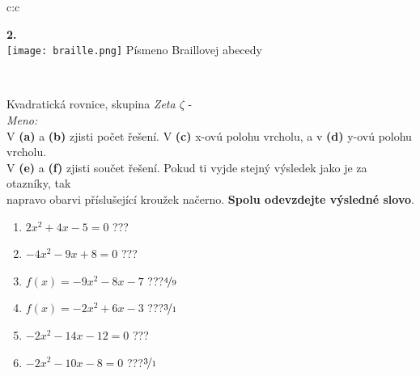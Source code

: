 \documentclass[10pt]{report}
\begin{document}
\begin{tabular}{c:c}
\begin{minipage}[c][99mm][t]{0.49\linewidth}
\begin{center}
\begin{minipage}{0.20\linewidth}
\begin{center}
{\Huge\bfseries 2.} \\[2mm]
\texttt{[image: braille.png]}
{\small Písmeno Braillovej abecedy}
\end{center}
\end{minipage}
\end{center}
\end{minipage}
\\ \hdashline
\begin{minipage}[c][99mm][t]{0.49\linewidth}
\begin{center}
\vspace{7mm}
{\huge Kvadratická rovnice, skupina \textit{Zeta $\zeta$} -}\\[4.5mm]
\textit{Meno:}\phantom{xxxxxxxxxxxxxxxxxxxxxxxxxxxxxxxxxxxxxxxxxxxxxxxxxxxxxxxxxxxxxxxxx}\\[3.5mm]
V \textbf{(a)} a \textbf{(b)} zjisti počet řešení. V \textbf{(c)} x-ovú polohu vrcholu, a v \textbf{(d)} y-ovú polohu vrcholu.\\V \textbf{(e)} a \textbf{(f)} zjisti součet řešení. Pokud ti vyjde stejný výsledek jako je za otazníky, tak\\napravo obarvi příslušející kroužek načerno. \textbf{Spolu odevzdejte výsledné slovo}.\\[3mm]
\begin{minipage}{0.77\linewidth}
\begin{center}
\begin{varwidth}{\textwidth}
\begin{enumerate}
\large
\item $2x^2+4x-5=0$\quad \dotfill\; ???\;\dotfill {}
\item $-4x^2-9x+8=0$\quad \dotfill\; ???\;\dotfill {}
\item $f(x)=-9x^2-8x-7$\quad \dotfill\; ???\;\dotfill \quad $\nicefrac{4}{9}$
\item $f(x)=-2x^2+6x-3$\quad \dotfill\; ???\;\dotfill \quad $\nicefrac{3}{1}$
\item $-2x^2-14x-12=0$\quad \dotfill\; ???\;\dotfill {}
\item $-2x^2-10x-8=0$\quad \dotfill\; ???\;\dotfill \quad $\nicefrac{3}{1}$
\end{enumerate}
\end{varwidth}
\end{center}
\end{minipage}
\begin{minipage}{0.20\linewidth}
\begin{center}

\end{center}
\end{minipage}
\end{center}
\end{minipage}
\end{tabular}
\end{document}
